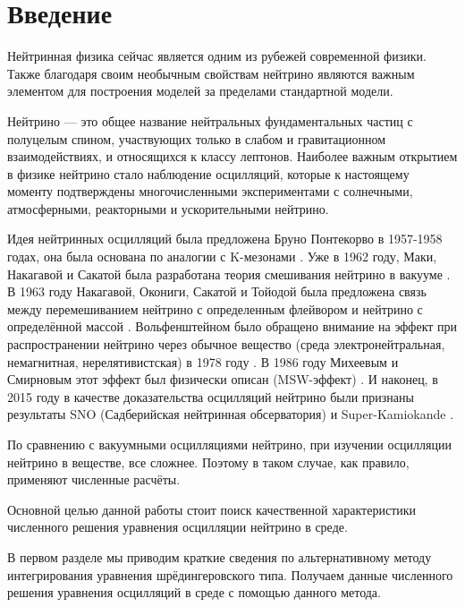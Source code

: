 \documentclass[a4paper,12pt]{article}
\begin{document}
\setcounter{page}{2}

\thispagestyle{empty}
\tableofcontents

\newpage

	\section*{Введение}
Нейтринная физика сейчас является одним из рубежей современной физики. Также благодаря своим необычным свойствам нейтрино являются важным элементом для построения моделей за пределами стандартной модели.

Нейтрино --- это общее название нейтральных фундаментальных частиц с полуцелым спином, участвующих только в слабом и гравитационном взаимодействиях, и относящихся к классу лептонов. Наиболее важным открытием в физике нейтрино стало наблюдение осцилляций, которые к настоящему моменту подтверждены многочисленными экспериментами с солнечными, атмосферными, реакторными и ускорительными нейтрино.

Идея нейтринных осцилляций была предложена Бруно Понтекорво в 1957-1958 годах, она была основана по аналогии с K-мезонами \cite{11, 22}. Уже в 1962 году, Маки, Накагавой и Сакатой была разработана теория смешивания нейтрино в вакууме \cite{33}. В 1963 году Накагавой, Окониги, Сакатой и Тойодой была предложена связь между перемешиванием нейтрино с определенным флейвором и нейтрино с определённой массой \cite{44}. Вольфенштейном было обращено внимание на эффект при распространении нейтрино через обычное вещество (среда электронейтральная, немагнитная, нерелятивистская) в 1978 году \cite{55, 66}. В 1986 году Михеевым и Смирновым этот эффект был физически описан (MSW-эффект) \cite{77, 88}. И наконец, в 2015 году в качестве доказательства осцилляций нейтрино были признаны результаты SNO (Садберийская нейтринная обсерватория) \cite{99} и Super-Kamiokande \cite{1010}.

По сравнению с вакуумными осцилляциями нейтрино, при изучении осцилляции нейтрино в веществе, все сложнее. Поэтому в таком случае, как правило, применяют численные расчёты.

Основной целью данной работы стоит поиск качественной характеристики численного решения уравнения осцилляции нейтрино в среде.

В первом разделе мы приводим краткие сведения по альтернативному методу интегрирования уравнения шрёдингеровского типа. Получаем данные численного решения уравнения осцилляций в среде с помощью данного метода.
\end{document}
